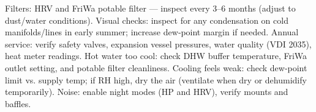 \markdownRendererUlEndTight \markdownRendererInterblockSeparator
{}
\markdownRendererSectionEnd \markdownRendererSectionBegin
{}\markdownRendererInterblockSeparator
{}\markdownRendererUlBeginTight
\markdownRendererUlItem Filters: HRV and FriWa potable filter — inspect every 3–6 months (adjust to dust/water conditions).\markdownRendererUlItemEnd 
\markdownRendererUlItem Visual checks: inspect for any condensation on cold manifolds/lines in early summer; increase dew‑point margin if needed.\markdownRendererUlItemEnd 
\markdownRendererUlItem Annual service: verify safety valves, expansion vessel pressures, water quality (VDI 2035), heat meter readings.\markdownRendererUlItemEnd 
\markdownRendererUlEndTight \markdownRendererInterblockSeparator
{}
\markdownRendererSectionEnd \markdownRendererSectionBegin
{}\markdownRendererInterblockSeparator
{}\markdownRendererUlBeginTight
\markdownRendererUlItem Hot water too cool: check DHW buffer temperature, FriWa outlet setting, and potable filter cleanliness.\markdownRendererUlItemEnd 
\markdownRendererUlItem Cooling feels weak: check dew‑point limit vs. supply temp; if RH high, dry the air (ventilate when dry or dehumidify temporarily).\markdownRendererUlItemEnd 
\markdownRendererUlItem Noise: enable night modes (HP and HRV), verify mounts and baffles.\markdownRendererUlItemEnd 
\markdownRendererUlEndTight 
\markdownRendererSectionEnd 
\markdownRendererSectionEnd \markdownRendererDocumentEnd